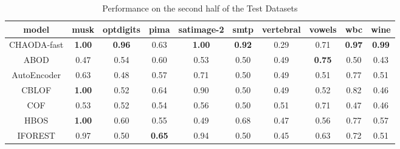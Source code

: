 \begin{table*}[!b]
\renewcommand{\arraystretch}{1.25}
\caption{Performance on the second half of the Test Datasets}
\label{table:results:test-performance-2}
\centering
\begin{tabular}{|c|c|c|c|c|c|c|c|c|c|}
\hline
\textbf{\textbf{model}} & \textbf{\textbf{musk}} & \textbf{\textbf{optdigits}} & \textbf{\textbf{pima}} & \textbf{\textbf{satimage-2}} & \textbf{\textbf{smtp}} & \textbf{\textbf{vertebral}} & \textbf{\textbf{vowels}} & \textbf{\textbf{wbc}} & \textbf{\textbf{wine}} \\
\hline
                CHAODA-fast &          \textbf{1.00} &               \textbf{0.96} &                   0.63 &                \textbf{1.00} &          \textbf{0.92} &                        0.29 &                     0.71 &         \textbf{0.97} &          \textbf{0.99} \\
\hline
                        ABOD &                   0.47 &                        0.54 &                   0.60 &                         0.53 &                   0.50 &                        0.49 &            \textbf{0.75} &                  0.50 &                   0.43 \\
\hline
                AutoEncoder &                   0.63 &                        0.48 &                   0.57 &                         0.71 &                   0.50 &                        0.49 &                     0.51 &                  0.77 &                   0.51 \\
\hline
                        CBLOF &          \textbf{1.00} &                        0.52 &                   0.64 &                         0.90 &                   0.50 &                        0.49 &                     0.52 &                  0.82 &                   0.46 \\
\hline
                        COF &                   0.53 &                        0.52 &                   0.54 &                         0.56 &                   0.50 &                        0.51 &                     0.71 &                  0.47 &                   0.46 \\
\hline
                        HBOS &          \textbf{1.00} &                        0.60 &                   0.55 &                         0.49 &                   0.68 &                        0.47 &                     0.56 &                  0.77 &                   0.57 \\
\hline
                IFOREST &                   0.97 &                        0.50 &          \textbf{0.65} &                         0.94 &                   0.50 &                        0.45 &                     0.63 &                  0.72 &                   0.51 \\

\end{tabular}
\end{table*}
